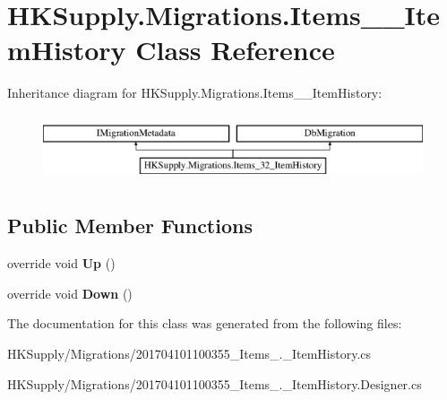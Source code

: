 \hypertarget{class_h_k_supply_1_1_migrations_1_1_items__32___item_history}{}\section{H\+K\+Supply.\+Migrations.\+Items\+\_\+\_\+\+Item\+History Class Reference}
\label{class_h_k_supply_1_1_migrations_1_1_items__32___item_history}
Inheritance diagram for H\+K\+Supply.\+Migrations.\+Items\+\_\+\_\+\+Item\+History\+:\begin{figure}[H]
\begin{center}
\leavevmode
\includegraphics[height=2.000000cm]{class_h_k_supply_1_1_migrations_1_1_items__32___item_history}
\end{center}
\end{figure}
\subsection*{Public Member Functions}
\begin{DoxyCompactItemize}
\item 
\mbox{\label{class_h_k_supply_1_1_migrations_1_1_items__32___item_history_abcd12c2fb889dc591c5a6e19bf3d30bc}} 
override void {\bfseries Up} ()
\item 
\mbox{\label{class_h_k_supply_1_1_migrations_1_1_items__32___item_history_a58dfc602aaa8276c6e17d1975d28529c}} 
override void {\bfseries Down} ()
\end{DoxyCompactItemize}


The documentation for this class was generated from the following files\+:\begin{DoxyCompactItemize}
\item 
H\+K\+Supply/\+Migrations/201704101100355\+\_\+\+Items\+\_.\+\_\+\+Item\+History.\+cs\item 
H\+K\+Supply/\+Migrations/201704101100355\+\_\+\+Items\+\_.\+\_\+\+Item\+History.\+Designer.\+cs\end{DoxyCompactItemize}
